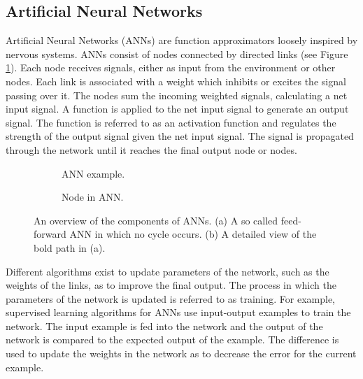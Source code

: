 \newpage
\subsection{Artificial Neural Networks}
\newline
{}
\newline
Artificial Neural Networks (ANNs) are function approximators loosely inspired by nervous systems.
ANNs consist of nodes connected by directed links (see Figure \ref{feedforward}). Each node receives signals, either as input from
the environment or other nodes. Each link is associated with a weight which inhibits or excites the signal passing
over it. The nodes sum the incoming weighted signals, calculating a net input signal. A function
is applied to the net input signal to generate an output signal. The function is referred to as an activation function
and regulates the strength of the output signal given the net input signal. The signal is propagated through the network
until it reaches the final output node or nodes.


\begin{figure}[htb]
    \begin{mdframed}
        \begin{subfigure}[b]{0.5\textwidth}
            \centering
            \resizebox{0.7\textwidth}{!}{}
            \caption{ANN example.}
            \label{feedforward}
        \end{subfigure}
        \begin{subfigure}[b]{0.5\textwidth}
            \centering
            \resizebox{0.9\textwidth}{!}{}
            \caption{Node in ANN.}
            \label{neuron}
        \end{subfigure}
    \end{mdframed}
    \caption{An overview of the components of ANNs. (a) A so called feed-forward ANN in which no cycle occurs. (b)
             A detailed view of the bold path in (a).}
\end{figure}


\newline
Different algorithms exist to update parameters of the network, such as the weights of the
links, as to improve the final output. The process in which the parameters of the network is updated
is referred to as training. For example, supervised learning algorithms for ANNs use input-output examples
to train the network. The input example is fed into the network and the output of the network is compared to
the expected output of the example. The difference is used to update the weights in the network as to decrease
the error for the current example.


